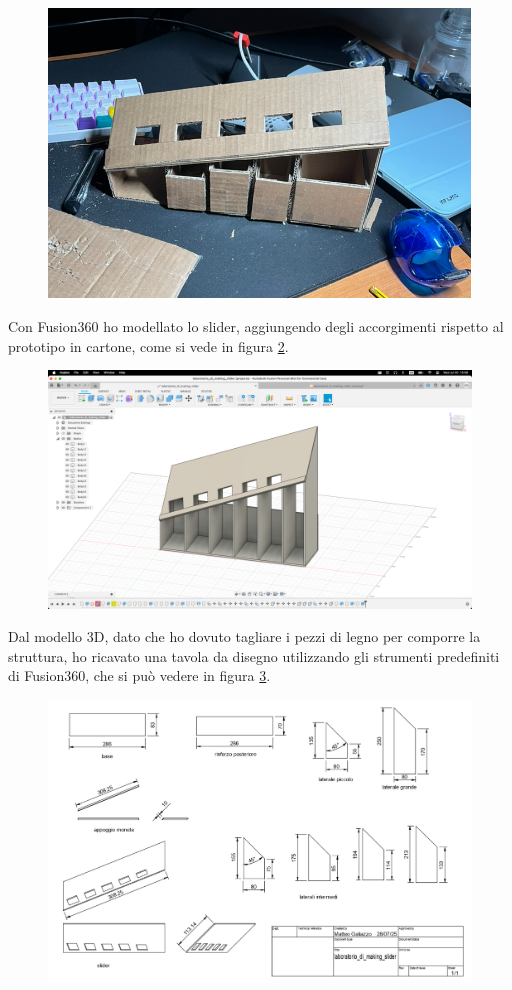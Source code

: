 \documentclass{article}
\begin{document}
\begin{figure}[htbp]
  \centering
  \includegraphics[width=0.8\linewidth]{./images/prototipo.png}
  \caption{}
  \label{fig:prototipo}
\end{figure}

Con Fusion360 ho modellato lo slider, aggiungendo degli accorgimenti rispetto al prototipo in cartone, come si vede in figura \ref{fig:screen_slider}.

\begin{figure}[htbp]
  \centering
  \includegraphics[width=0.8\linewidth]{./images/screen_slider.png}
  \caption{}
  \label{fig:screen_slider}
\end{figure}

Dal modello 3D, dato che ho dovuto tagliare i pezzi di legno per comporre la struttura, ho ricavato una tavola da disegno utilizzando gli strumenti predefiniti di Fusion360, che si può vedere in figura \ref{fig:tavola_slider}.

\begin{figure}[htbp]
  \centering
  \includegraphics[width=0.8\linewidth]{./images/tavola_slider.png}
  \caption{}
  \label{fig:tavola_slider}
\end{figure}
\end{document}
